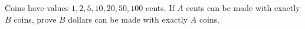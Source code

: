 Coins have values $1,2,5,10,20,50,100$ cents. If $A$ cents can be made with exactly $B$ coins, prove $B$ dollars can be made with exactly $A$ coins.
